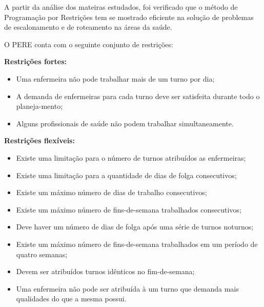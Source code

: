 A partir da análise dos mateiras estudados, foi verificado que o método de Programação por Restrições tem se mostrado eficiente na solução de problemas de escalonamento e de roteamento na áreas da saúde. 

O \ac{PERE} conta com o seguinte conjunto de restrições:

\textbf{Restrições fortes:}
\begin{itemize}
\item Uma enfermeira não pode trabalhar mais de um turno por dia;
\item A demanda de enfermeiras para cada turno deve ser satisfeita durante todo o planeja-mento;
\item Alguns profissionais de saúde não podem trabalhar simultaneamente.
\end{itemize}
 
\textbf{Restrições flexíveis:}
\begin{itemize}
\item Existe uma limitação para o número de turnos atribuídos as enfermeiras; 
\item Existe uma limitação para a quantidade de dias de folga consecutivos; 
\item Existe um máximo número de dias de trabalho consecutivos;
\item Existe um máximo número de fins-de-semana trabalhados consecutivos;
\item Deve haver um número de dias de folga após uma série de turnos noturnos;
\item Existe um máximo número de fins-de-semana trabalhados em um período de quatro semanas; 
\item Devem ser atribuídos turnos idênticos no fim-de-semana;
\item Uma enfermeira não pode ser atribuída à um turno que demanda mais qualidades do que a mesma possui.
\end{itemize}



